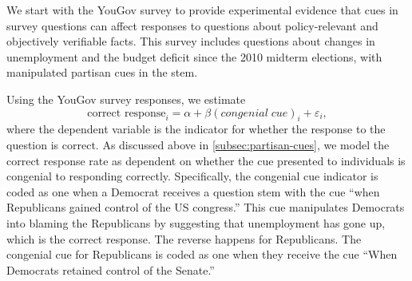 \documentclass[12pt, letterpaper]{article}
\begin{document}
We start with the YouGov survey to provide experimental evidence that cues in survey questions can affect responses to questions about policy-relevant and objectively verifiable facts. This survey includes questions about changes in unemployment and the budget deficit since the 2010 midterm elections, with manipulated partisan cues in the stem. 

Using the YouGov survey responses, we estimate
\begin{equation}\label{eq:pgap-yougov}
\text{correct response}_{i} = \alpha + \beta (congenial \; cue)_i  +\varepsilon_{i},
\end{equation}
where the dependent variable is the indicator for whether the response to the question is correct.
As discussed above in \cref{subsec:partisan-cues}, we model the correct response rate as dependent on whether the cue presented to individuals is congenial to responding correctly. Specifically, the congenial cue indicator is coded as one when a Democrat receives a question stem with the cue ``when Republicans gained control of the US congress.'' This cue manipulates Democrats into blaming the Republicans by suggesting that unemployment has gone up, which is the correct response. The reverse happens for Republicans. The congenial cue for Republicans is coded as one when they receive the cue ``When Democrats retained control of the Senate.''
\end{document}
